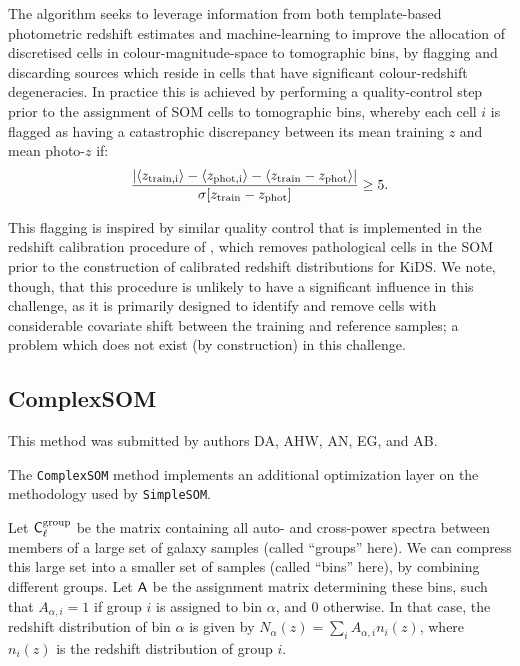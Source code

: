 \documentclass[twocolumn,twocolappendix]{aastex63}
\begin{document}
The algorithm seeks to leverage information from both template-based 
photometric redshift estimates and machine-learning to improve the allocation of discretised cells in 
colour-magnitude-space to tomographic bins, by flagging and discarding sources which reside in cells that have 
significant colour-redshift degeneracies. In practice this is achieved by performing a quality-control step prior to 
the assignment of SOM cells to tomographic bins, whereby each cell $i$ is flagged as having a catastrophic 
discrepancy between its mean training $z$ and mean photo-$z$ if: 
\begin{equation}
\frac{|\langle z_{\rm train,i}\rangle - \langle z_{\rm phot,i}\rangle  -\langle z_{\rm train} - z_{\rm phot}\rangle|}
{\sigma[z_{\rm train} - z_{\rm phot}]} \geq 5.
\end{equation}

This flagging is inspired by similar quality control that is implemented in the redshift calibration procedure of
\citet{Wright/etal:2020a}, which removes pathological cells in the SOM prior to the construction of calibrated 
redshift distributions for KiDS. We note, though, that this procedure is unlikely to have a significant influence in this 
challenge, as it is primarily designed to identify and remove cells with considerable covariate shift between the 
training and reference samples; a problem which does not exist (by construction) in this challenge.


\subsection{ {\sc ComplexSOM} } \label{sec:csom}
This method was submitted by authors DA, AHW, AN, EG, and AB.

The {\tt ComplexSOM} method implements an additional optimization layer on the
methodology used by {\tt SimpleSOM}.

Let ${\sf C}^{\rm group}_\ell$ be the matrix containing all auto- and
cross-power spectra between members of a large set of galaxy samples (called
``groups'' here). We can compress this large set into a smaller set of samples
(called ``bins'' here), by combining different groups. Let ${\sf A}$ be the
assignment matrix determining these bins, such that $A_{\alpha,i}=1$ if group
$i$ is assigned to bin $\alpha$, and 0 otherwise. In that case, the redshift
distribution of bin $\alpha$ is given by $N_\alpha(z)=\sum_i
A_{\alpha,i}n_i(z)$, where $n_i(z)$ is the redshift distribution of group $i$.
\end{document}
